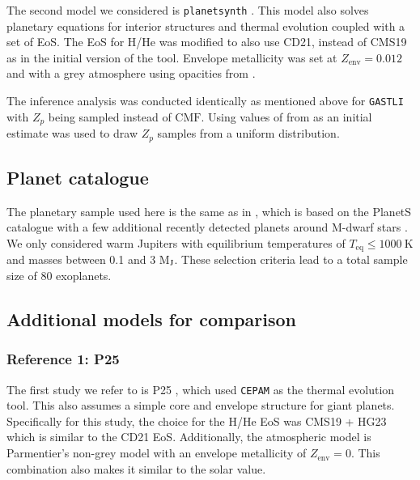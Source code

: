 \documentclass{aa}
\begin{document}
The second model we considered is \texttt{planetsynth}  \citep{muller_synthetic_2021}. This model also solves planetary equations for interior structures and thermal evolution coupled with a set of EoS. The EoS for H/He was modified to also use CD21, instead of CMS19 \citep{chabrier_new_2019} as in the initial version of the tool. Envelope metallicity was set at $Z_{\text{env}} = 0.012$ and with a grey atmosphere using opacities from \citep{freedman_gaseous_2014}.

The inference analysis was conducted identically as mentioned above for \texttt{GASTLI} with $Z_p$ being sampled instead of $\text{CMF}$. Using values of from \cite{muller_bulk_2025} as an initial estimate was used to draw $Z_p$ samples from a uniform distribution.


\subsection{Planet catalogue}\label{sec:planet_catalogue}
The planetary sample used here is the same as in \citet{muller_bulk_2025}, which is based on the PlanetS catalogue \citep{parc_super-earths_2024} with a few additional recently detected planets around M-dwarf stars \citep{hartman_toi_2024,2024AJ....168..235K}. We only considered warm Jupiters with equilibrium temperatures of $T_{\text{eq}} \le 1000\: \si{\kelvin}$ and masses between 0.1 and 3 M$_{\rm{J}}$. These selection criteria lead to a total sample size of 80 exoplanets.


\subsection{Additional models for comparison}\label{sec:additional_models}
\subsubsection{Reference 1: P25}
The first study we refer to is P25 \citep{peerani_how_2025}, which used \texttt{CEPAM} \citep{guillot_cepam_1995} as the thermal evolution tool. This also assumes a simple core and envelope structure for giant planets. Specifically for this study, the choice for the H/He EoS was CMS19 + HG23 \citep{chabrier_new_2019, howard_accounting_2023} which is similar to the CD21 EoS. Additionally, the atmospheric model is Parmentier's non-grey model \citep{parmentier_non-grey_2015} with an envelope metallicity of $Z_{\text{env}} = 0$. This combination also makes it similar to the solar value.
\end{document}
